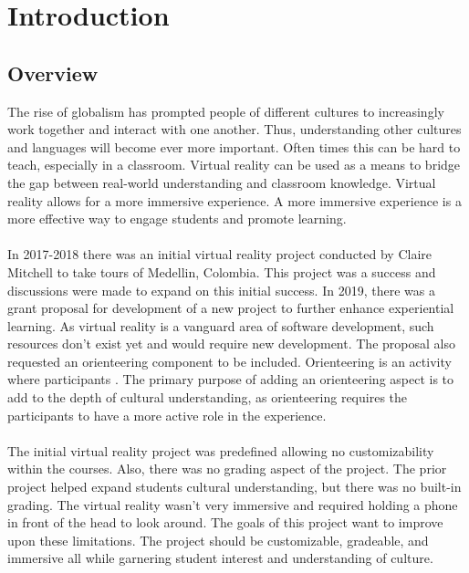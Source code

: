 \section{Introduction}
\label{sec:Introduction}

\subsection{Overview} 
The rise of globalism has prompted people of different cultures to increasingly work together and interact with one another. Thus, understanding other cultures and languages will become ever more important. Often times this can be hard to teach, especially in a classroom. Virtual reality can be used as a means to bridge the gap between real-world understanding and classroom knowledge. Virtual reality allows for a more immersive experience. A more immersive experience is a more effective way to engage students and promote learning. \\
\\
In 2017-2018 there was an initial virtual reality project conducted by Claire Mitchell to take tours of Medellin, Colombia. This project was a success and discussions were made to expand on this initial success. In 2019, there was a grant proposal for development of a new project to further enhance experiential learning. As virtual reality is a vanguard area of software development, such resources don't exist yet and would require new development. The proposal also requested an orienteering component to be included. Orienteering is an activity where participants . The primary purpose of adding an orienteering aspect is to add to the depth of cultural understanding, as orienteering requires the participants to have a more active role in the experience. \\
\\
The initial virtual reality project was predefined allowing no customizability within the courses. Also, there was no grading aspect of the project. The prior project helped expand students cultural understanding, but there was no built-in grading. The virtual reality wasn't very immersive and required holding a phone in front of the head to look around. The goals of this project want to improve upon these limitations. The project should be customizable, gradeable, and immersive all while garnering student interest and understanding of culture.  
